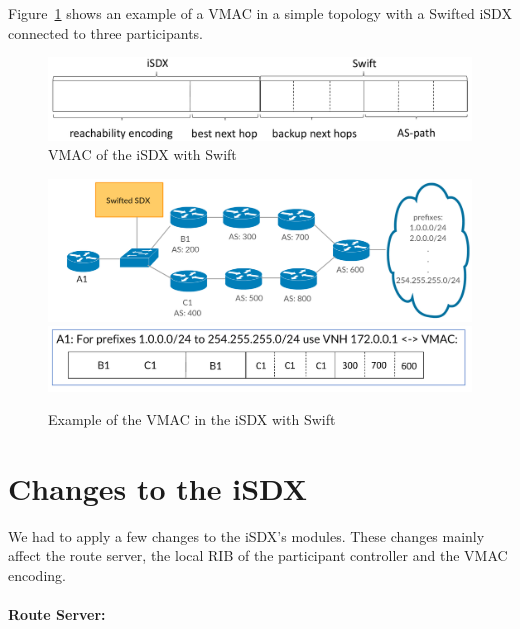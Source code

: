 Figure~\ref{fig:sixdsvmac} shows an example of a VMAC in a simple topology with a Swifted iSDX connected to three participants. 

\begin{figure}[h]
\center
\includegraphics[scale = 0.5]{Figures/design_vmac3_cropped.pdf}
\caption{VMAC of the iSDX with Swift}
\end{figure}

\begin{figure}[h]
\center
\includegraphics[scale = 0.24]{Figures/design_vmac_topology.pdf}
\includegraphics[scale = 0.35]{Figures/vmac_picture_cropped.pdf}
\caption{Example of the VMAC in the iSDX with Swift}
\label{fig:sixdsvmac}
\end{figure}

\section{\label{chapter4:Changes_to_the_iSDX}Changes to the iSDX}

We had to apply a few changes to the iSDX's modules. These changes mainly affect the route server, the local RIB of the participant controller and the VMAC encoding. 

\paragraph{\label{chapter4:Changes to the iSDX:route server}Route Server:}

